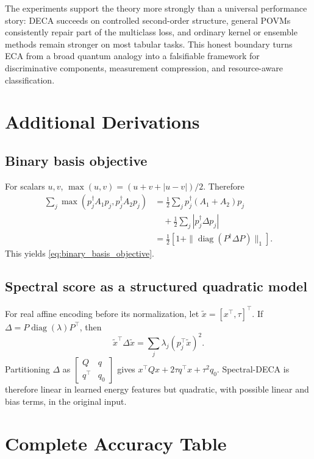 \documentclass[10pt,twocolumn]{article}
\theoremstyle{definition}
\theoremstyle{remark}
\newcommand{\diag}{\operatorname{diag}}
\begin{document}
The experiments support the theory more strongly than a universal performance
story: DECA succeeds on controlled second-order structure, general POVMs
consistently repair part of the multiclass loss, and ordinary kernel or
ensemble methods remain stronger on most tabular tasks.  This honest boundary
turns ECA from a broad quantum analogy into a falsifiable framework for
discriminative components, measurement compression, and resource-aware
classification.

\appendix

\section{Additional Derivations}

\subsection{Binary basis objective}
For scalars $u,v$, $\max(u,v)=(u+v+|u-v|)/2$.  Therefore
\[
\begin{aligned}
\sum_j\max(p_j^\dagger A_1p_j,p_j^\dagger A_2p_j)
&=\frac12\sum_j p_j^\dagger(A_1+A_2)p_j\\
&\quad+\frac12\sum_j|p_j^\dagger\Delta p_j|\\
&=\frac12\left[1+
\|\diag(P^\dagger\Delta P)\|_1\right].
\end{aligned}
\]
This yields \cref{eq:binary_basis_objective}.

\subsection{Spectral score as a structured quadratic model}
For real affine encoding before its normalization, let
$\widetilde x=[x^\top,\tau]^\top$.  If
$\Delta=P\diag(\lambda)P^\top$, then
\[
\widetilde x^\top\Delta\widetilde x
=\sum_j\lambda_j(p_j^\top\widetilde x)^2.
\]
Partitioning $\Delta$ as
$\left[\begin{smallmatrix}Q&q\\q^\top&q_0\end{smallmatrix}\right]$
gives $x^\top Qx+2\tau q^\top x+\tau^2q_0$.  Spectral-DECA is therefore
linear in learned energy features but quadratic, with possible linear and
bias terms, in the original input.

\section{Complete Accuracy Table}
\label{app:complete}
\end{document}
